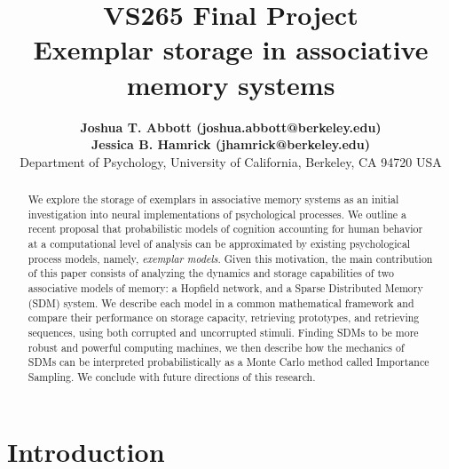 \documentclass[10pt,letterpaper]{article}
\title{{\bf VS265 Final Project}\\Exemplar storage in associative memory systems}
\author{{\large \bf Joshua T. Abbott (joshua.abbott@berkeley.edu)\footnoteremember{myfootnote}{The authors contributed equally to this work.}} \\
 {\large \bf Jessica B. Hamrick (jhamrick@berkeley.edu)\footnoterecall{myfootnote}} \\
  Department of Psychology, University of California, Berkeley, CA 94720 USA}
\date{}
\begin{document}
\maketitle

\begin{abstract}
We explore the storage of exemplars in associative memory systems as an initial investigation into neural implementations of psychological processes. We outline a recent proposal that probabilistic models of cognition accounting for human behavior at a computational level of analysis can be approximated by existing psychological process models, namely, \textit{exemplar models}. Given this motivation, the main contribution of this paper consists of analyzing the dynamics and storage capabilities of two associative models of memory: a Hopfield network, and a Sparse Distributed Memory (SDM) system. We describe each model in a common mathematical framework and compare their performance  on storage capacity, retrieving prototypes, and retrieving sequences, using both corrupted and uncorrupted stimuli. Finding SDMs to be more robust and powerful computing machines, we then describe how the mechanics of SDMs can be interpreted probabilistically as a Monte Carlo method called Importance Sampling. We conclude with future directions of this research. 

\end{abstract}

\section{Introduction}
\end{document}
